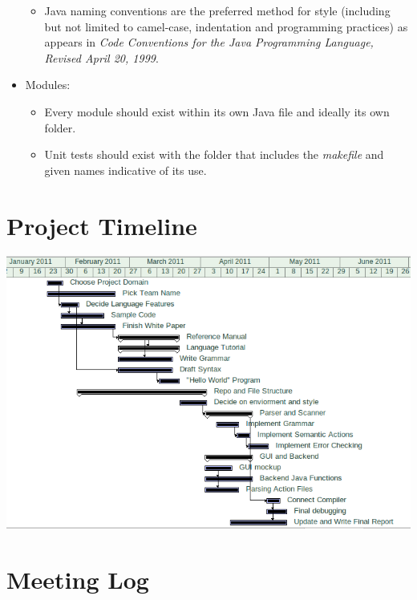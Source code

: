 \documentclass[12pt]{report}
\begin{document}
\begin{itemize}
\begin{itemize}
\item Java naming conventions are the preferred method for style (including but not limited to camel-case, indentation and programming practices) as appears in \textit{Code Conventions for the Java Programming Language, Revised April 20, 1999}.
\end{itemize}
\item Modules:
\begin{itemize}
\item Every module should exist within its own Java file and ideally its own folder.
\item Unit tests should exist with the folder that includes the \textit{makefile} and given names indicative of its use.
\end{itemize}
\end{itemize}

\section{Project Timeline}

\includegraphics[scale=0.7]{project_timeline.png}

\section{Meeting Log}
\end{document}
